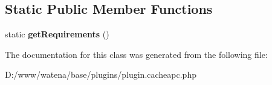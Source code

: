 \subsection*{Static Public Member Functions}
\begin{DoxyCompactItemize}
\item 
\hypertarget{class_cache_a_p_c_a38d69502e83c7d975457f8ba75726686}{static {\bfseries get\-Requirements} ()}\label{class_cache_a_p_c_a38d69502e83c7d975457f8ba75726686}

\end{DoxyCompactItemize}


The documentation for this class was generated from the following file\-:\begin{DoxyCompactItemize}
\item 
D\-:/www/watena/base/plugins/plugin.\-cacheapc.\-php\end{DoxyCompactItemize}
